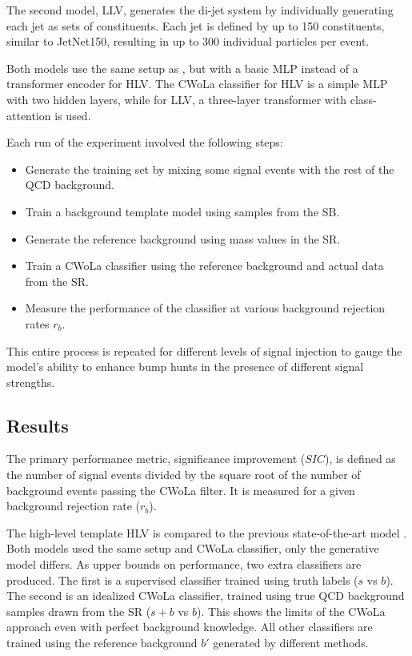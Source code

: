 The second model, \drapes LLV, generates the di-jet system by individually generating each jet as sets of constituents.
Each jet is defined by up to 150 constituents, similar to JetNet150, resulting in up to 300 individual particles per event.

Both models use the same setup as \pcdroid, but with a basic MLP instead of a transformer encoder for \drapes HLV.
The CWoLa classifier for \drapes HLV is a simple MLP with two hidden layers, while for \drapes LLV, a three-layer transformer with class-attention is used.

Each run of the experiment involved the following steps:
\begin{itemize}
    \item Generate the training set by mixing some signal events with the rest of the QCD background.
    \item Train a background template model using samples from the SB.
    \item Generate the reference background using mass values in the SR.
    \item Train a CWoLa classifier using the reference background and actual data from the SR.
    \item Measure the performance of the classifier at various background rejection rates $r_b$.
\end{itemize}
This entire process is repeated for different levels of signal injection to gauge the model's ability to enhance bump hunts in the presence of different signal strengths.

\subsection{Results}

The primary performance metric, significance improvement ($SIC$), is defined as the number of signal events divided by the square root of the number of background events passing the CWoLa filter.
It is measured for a given background rejection rate ($r_b$).

The high-level template \drapes HLV is compared to the previous state-of-the-art model \FfF.
Both models used the same setup and CWoLa classifier, only the generative model differs.
As upper bounds on performance, two extra classifiers are produced.
The first is a supervised classifier trained using truth labels ($s$ vs $b$).
The second is an idealized CWoLa classifier, trained using true QCD background samples drawn from the SR ($s+b$ vs $b$).
This shows the limits of the CWoLa approach even with perfect background knowledge.
All other classifiers are trained using the reference background $b'$ generated by different methods.

